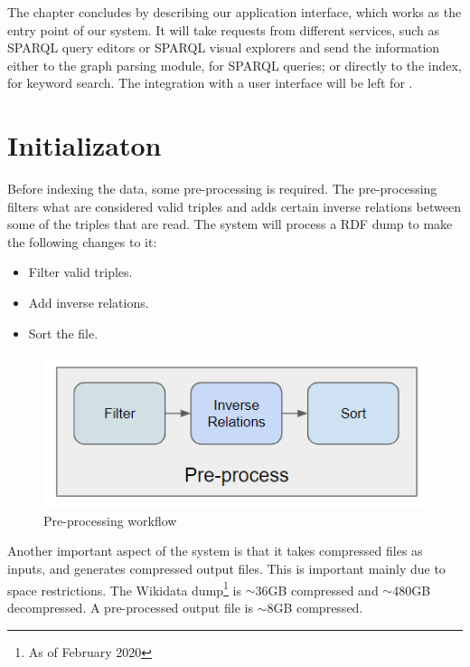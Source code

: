 The chapter concludes by describing our application interface, which works as the entry point of our system. 
It will take requests from different services, such as SPARQL query editors or SPARQL visual explorers and send the information either to the graph parsing module, for SPARQL queries; 
or directly to the index, for keyword search. 
The integration with a user interface will be left for .


\section{Initializaton}
\label{chap:init}

Before indexing the data, some pre-processing is required. 
The pre-processing filters what are considered valid triples and adds certain inverse relations between some of the triples that are read. 
The system will process a RDF dump to make the following changes to it:
\begin{itemize}
    \item Filter valid triples.
    \item Add inverse relations.
    \item Sort the file.
\end{itemize}

\begin{figure}[H]
    \centering
        \includegraphics[width=0.5\linewidth]{imagenes/Preprocess.png}
        \caption{Pre-processing workflow}
        \label{fig:preprocess}
\end{figure}

Another important aspect of the system is that it takes compressed files as inputs, and generates compressed output files. 
This is important mainly due to space restrictions. 
The Wikidata dump\footnote{As of February 2020} is $\sim$36GB compressed and $\sim$480GB decompressed.
A pre-processed output file is $\sim$8GB compressed. 

